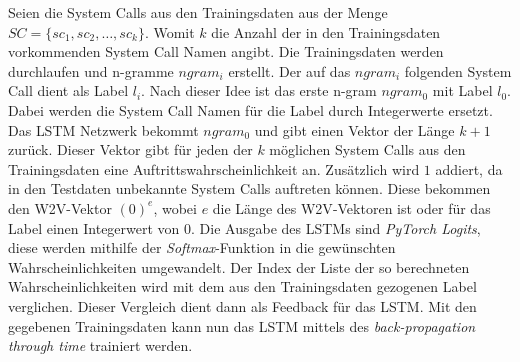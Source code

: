             Seien die System Calls aus den Trainingsdaten aus der Menge $SC = \{sc_1,sc_2,\dots,sc_k\}$.
            Womit $k$ die Anzahl der in den Trainingsdaten vorkommenden System Call Namen angibt.
            Die Trainingsdaten werden durchlaufen und n-gramme $ngram_i$ erstellt.
            Der auf das $ngram_i$ folgenden System Call dient als Label $l_i$.
            Nach dieser Idee ist das erste n-gram $ngram_0$ mit Label $l_0$.
            Dabei werden die System Call Namen für die Label durch Integerwerte ersetzt. 
            Das \ac{LSTM} Netzwerk bekommt $ngram_0$ und gibt einen Vektor der Länge $k+1$ zurück.
            Dieser Vektor gibt für jeden der $k$ möglichen System Calls aus den Trainingsdaten eine Auftrittswahrscheinlichkeit an.
            Zusätzlich wird $1$ addiert, da in den Testdaten unbekannte System Calls auftreten können.
            Diese bekommen den \ac{W2V}-Vektor $(0)^e$, wobei $e$ die Länge des \ac{W2V}-Vektoren ist oder für das Label einen Integerwert von $0$. 
            Die Ausgabe des \acp{LSTM} sind \textit{PyTorch Logits}, diese werden mithilfe der \textit{Softmax}-Funktion in die gewünschten Wahrscheinlichkeiten umgewandelt.
            Der Index der Liste der so berechneten Wahrscheinlichkeiten wird mit dem aus den Trainingsdaten gezogenen Label verglichen.
            Dieser Vergleich dient dann als Feedback für das \ac{LSTM}.
            Mit den gegebenen Trainingsdaten kann nun das \ac{LSTM} mittels des \textit{back-propagation through time}  trainiert werden.

